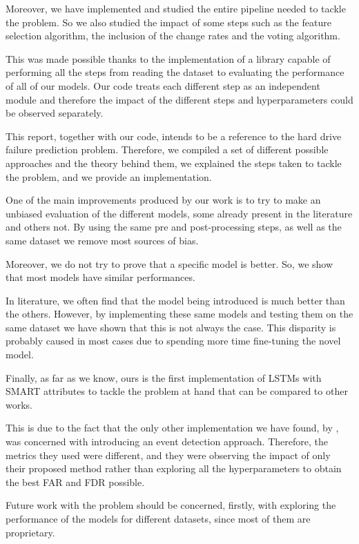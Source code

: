 Moreover, we have implemented and studied the entire pipeline needed to tackle the problem.
So we also studied the impact of some steps such as the feature selection algorithm, the inclusion of the change rates and the voting algorithm.

This was made possible thanks to the implementation of a library capable of performing all the steps from reading the dataset to evaluating the performance of all of our models.
Our code treats each different step as an independent module and therefore the impact of the different steps and hyperparameters could be observed separately.

This report, together with our code, intends to be a reference to the hard drive failure prediction problem.
Therefore, we compiled a set of different possible approaches and the theory behind them, we explained the steps taken to tackle the problem, and we provide an implementation.

One of the main improvements produced by our work is to try to make an unbiased evaluation of the different models, some already present in the literature and others not.
By using the same pre and post-processing steps, as well as the same dataset we remove most sources of bias.

Moreover, we do not try to prove that a specific model is better.
So, we show that most models have similar performances.

In literature, we often find that the model being introduced is much better than the others. 
However, by implementing these same models and testing them on the same dataset we have shown that this is not always the case.
This disparity is probably caused in most cases due to spending more time fine-tuning the novel model.

Finally, as far as we know, ours is the first implementation of LSTMs with SMART attributes to tackle the problem at hand that can be compared to other works.

This is due to the fact that the only other implementation we have found, by \cite{zhang2017deep}, was concerned with introducing an event detection approach.
Therefore, the metrics they used were different, and they were observing the impact of only their proposed method rather than exploring all the hyperparameters to obtain the best FAR and FDR possible.

Future work with the problem should be concerned, firstly, with exploring the performance of the models for different datasets, since most of them are proprietary.

